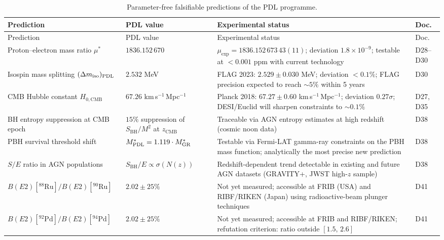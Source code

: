 \documentclass[11pt,a4paper]{article}
\theoremstyle{plain}
\theoremstyle{definition}
\theoremstyle{remark}
\newcommand{\PDL}{\textnormal{PDL}}
\newcommand{\mustar}{\mu^*}
\newcommand{\SBH}{S_{\mathrm{BH}}}
\begin{document}
\begin{longtable}{@{}L{4.5cm}L{3.5cm}L{3.5cm}L{1.5cm}@{}}
\caption{Parameter-free falsifiable predictions of the PDL programme.}
\label{tab:predictions}\\
\toprule
Prediction & PDL value & Experimental status & Doc. \\
\midrule
\endfirsthead
\toprule
Prediction & PDL value & Experimental status & Doc. \\
\midrule
\endhead
\bottomrule
\endfoot

Proton--electron mass ratio $\mustar$ &
$1836.152\,670$ &
$\mu_{\exp}=1836.152\,673\,43(11)$; deviation $1.8\times10^{-9}$; testable at $<0.001$ ppm with current technology &
D28--D30 \\[0.4em]

Isospin mass splitting $(\Delta m_{\mathrm{iso}})_{\PDL}$ &
$2.532$ MeV &
FLAG 2023: $2.529\pm0.030$ MeV; deviation $<0.1\%$; FLAG precision expected to reach $\sim 5\%$ within 5 years &
D30 \\[0.4em]

CMB Hubble constant $H_{0,\mathrm{CMB}}$ &
$67.26$ km\,s$^{-1}$\,Mpc$^{-1}$ &
Planck 2018: $67.27\pm0.60$ km\,s$^{-1}$\,Mpc$^{-1}$; deviation $0.27\sigma$; DESI/Euclid will sharpen constraints to $\sim 0.1\%$ &
D27, D35 \\[0.4em]

BH entropy suppression at CMB epoch &
$15\%$ suppression of $\SBH/M^2$ at $z_{\mathrm{CMB}}$ &
Traceable via AGN entropy estimates at high redshift (cosmic noon data) &
D38 \\[0.4em]

PBH survival threshold shift &
$M^*_{\PDL} = 1.119\cdot M^*_{\mathrm{GR}}$ &
Testable via Fermi-LAT gamma-ray constraints on the PBH mass function; analytically the most precise new prediction &
D38 \\[0.4em]

$S/E$ ratio in AGN populations &
$S_{\mathrm{BH}}/E \propto \sigma(N(z))$ &
Redshift-dependent trend detectable in existing and future AGN datasets (GRAVITY+, JWST high-$z$ sample) &
D38 \\[0.4em]

$B(E2)[^{88}\text{Ru}]/B(E2)[^{90}\text{Ru}]$ &
$2.02 \pm 25\%$ &
Not yet measured; accessible at FRIB (USA) and RIBF/RIKEN (Japan) using radioactive-beam plunger techniques &
D41 \\[0.4em]

$B(E2)[^{92}\text{Pd}]/B(E2)[^{94}\text{Pd}]$ &
$2.02 \pm 25\%$ &
Not yet measured; accessible at FRIB and RIBF/RIKEN; refutation criterion: ratio outside $[1.5,\,2.6]$ &
D41 \\[0.4em]

\end{longtable}
\end{document}

